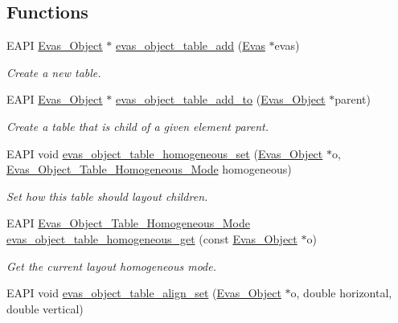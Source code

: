 \subsection*{Functions}
\begin{DoxyCompactItemize}
\item 
EAPI \hyperlink{group__Evas__Object__Group_ga9e19e6dd1f517a0ba437c0114d3e7c97}{Evas\_\-Object} $\ast$ \hyperlink{group__Evas__Object__Table_gaa8950ef1784409f64fc02345b839768d}{evas\_\-object\_\-table\_\-add} (\hyperlink{group__Evas__Canvas_ga5ff87cc4ce6bc43e3b640a6d37f73043}{Evas} $\ast$evas)
\begin{DoxyCompactList}\small\item\em Create a new table. \item\end{DoxyCompactList}\item 
EAPI \hyperlink{group__Evas__Object__Group_ga9e19e6dd1f517a0ba437c0114d3e7c97}{Evas\_\-Object} $\ast$ \hyperlink{group__Evas__Object__Table_gab5789072764ac24f48368182bd35d297}{evas\_\-object\_\-table\_\-add\_\-to} (\hyperlink{group__Evas__Object__Group_ga9e19e6dd1f517a0ba437c0114d3e7c97}{Evas\_\-Object} $\ast$parent)
\begin{DoxyCompactList}\small\item\em Create a table that is child of a given element {\itshape parent\/}. \item\end{DoxyCompactList}\item 
EAPI void \hyperlink{group__Evas__Object__Table_ga85462a0cbafd4ee4ceface6f3f69b413}{evas\_\-object\_\-table\_\-homogeneous\_\-set} (\hyperlink{group__Evas__Object__Group_ga9e19e6dd1f517a0ba437c0114d3e7c97}{Evas\_\-Object} $\ast$o, \hyperlink{group__Evas__Object__Table_ga04f33e792aea51d583c3e572a35ceebe}{Evas\_\-Object\_\-Table\_\-Homogeneous\_\-Mode} homogeneous)
\begin{DoxyCompactList}\small\item\em Set how this table should layout children. \item\end{DoxyCompactList}\item 
EAPI \hyperlink{group__Evas__Object__Table_ga04f33e792aea51d583c3e572a35ceebe}{Evas\_\-Object\_\-Table\_\-Homogeneous\_\-Mode} \hyperlink{group__Evas__Object__Table_ga1b96719d71cb4ca89a31eb59635df387}{evas\_\-object\_\-table\_\-homogeneous\_\-get} (const \hyperlink{group__Evas__Object__Group_ga9e19e6dd1f517a0ba437c0114d3e7c97}{Evas\_\-Object} $\ast$o)
\begin{DoxyCompactList}\small\item\em Get the current layout homogeneous mode. \item\end{DoxyCompactList}\item 
EAPI void \hyperlink{group__Evas__Object__Table_ga7299bcee8de1f9304fa31fff43347a45}{evas\_\-object\_\-table\_\-align\_\-set} (\hyperlink{group__Evas__Object__Group_ga9e19e6dd1f517a0ba437c0114d3e7c97}{Evas\_\-Object} $\ast$o, double horizontal, double vertical)\label{group__Evas__Object__Table_ga7299bcee8de1f9304fa31fff43347a45}


\end{DoxyCompactItemize}
